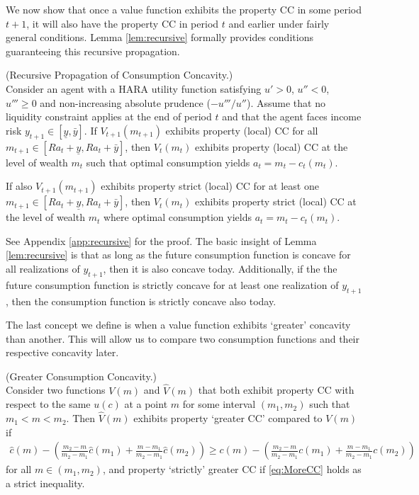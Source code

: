   \noindent We now show that once a value function exhibits the property CC in some period $t+1$, it will also have the property CC in period $t$ and earlier under fairly general conditions. Lemma \ref{lem:recursive} formally provides conditions guaranteeing this recursive propagation.

  \begin{lemma}\label{lem:recursive}(Recursive Propagation of Consumption Concavity.) \\
    Consider an agent with a HARA utility function satisfying $u' > 0$, $u'' < 0$, $u''' \geq 0$ and non-increasing absolute prudence ($-u'''/u''$). Assume that no liquidity constraint applies at the end of period $t$ and that the agent faces income risk $y_{t+1} \in [\underline{y},\bar{y}]$. If $V_{t+1}({m}_{t+1})$ exhibits property (local) CC for all ${m}_{t+1} \in [R{a}_{t} + \underline{y}, R{a}_{t} + \bar{y}]$, then $V_t({m}_{t})$ exhibits property (local) CC at the level of wealth ${m}_{t}$ such that optimal consumption yields ${a}_{t} = {m}_{t} - c_t({m}_{t})$.

    \medskip
    \noindent If also $V_{t+1}({m}_{t+1})$ exhibits property strict (local) CC for at least one ${m}_{t+1} \in [R{a}_{t} + \underline{y}, R{a}_{t} + \bar{y}]$, then $V_t({m}_{t})$ exhibits property strict (local) CC at the level of wealth ${m}_{t}$ where optimal consumption yields ${a}_{t} = {m}_{t} - c_t({m}_{t})$.
  \end{lemma}
  \noindent See Appendix \ref{app:recursive} for the proof. The basic insight of Lemma \ref{lem:recursive} is that as long as the future consumption function is concave for all realizations of $y_{t+1}$, then it is also concave today. Additionally, if the the future consumption function is strictly concave for at least one realization of ${y}_{t+1}$, then the consumption function is strictly concave also today.

  The last concept we define is when a value function exhibits `greater' concavity than another. This will allow us to compare two consumption functions and their respective concavity later.
  \begin{defn}\label{defn:MoreCC} (Greater Consumption Concavity.) \\ Consider two functions $V({m})$ and $\hat{V}({m})$ that both exhibit property CC with respect to the same $u(c)$ at a point ${m}$ for some interval $({m}_1,{m}_2)$ such that ${m}_1 < {m} < {m}_2$.  Then $\hat{V}({m})$ exhibits property `greater CC' compared to $V({m})$ if
    \begin{eqnarray}
      \hat{c}({m}) - \left(\frac{{m}_{2}-{m}}{{m}_{2}-{m}_{1}} \hat{c}({m}_{1})+\frac{{m}-{m}_{1}}{{m}_{2}-{m}_{1}}\hat{c}({m}_{2})\right) \geq c({m}) - \left(\frac{{m}_{2}-{m}}{{m}_{2}-{m}_{1}} c({m}_{1})+\frac{{m}-{m}_{1}}{{m}_{2}-{m}_{1}}c({m}_{2})\right) \label{eq:MoreCC}
    \end{eqnarray}
    for all ${m} \in ({m}_{1},{m}_{2})$, and property `strictly' greater CC if \eqref{eq:MoreCC}
    holds as a strict inequality.
  \end{defn}

